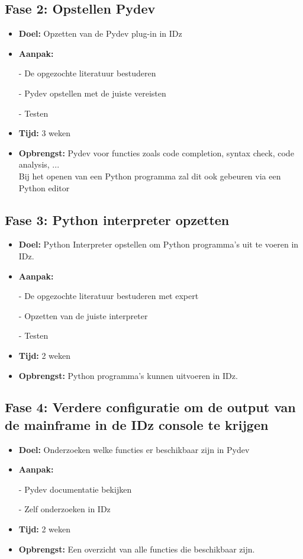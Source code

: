 \subsection{Fase 2: Opstellen Pydev}
\begin{itemize}
    \item \textbf{Doel:}
    Opzetten van de Pydev plug-in in IDz
    \item \textbf{Aanpak:}
    \item[-] De opgezochte literatuur bestuderen
    \item[-] Pydev opstellen met de juiste vereisten
    \item[-] Testen
    \item \textbf{Tijd:} 3 weken
    \item \textbf{Opbrengst:}
    Pydev voor functies zoals code completion, syntax check, code analysis, ... \\ 
    Bij het openen van een Python programma zal dit ook gebeuren via een Python editor
\end{itemize}


\subsection{Fase 3: Python interpreter opzetten}
\begin{itemize}
    \item \textbf{Doel:}
    Python Interpreter opstellen om Python programma's uit te voeren in IDz.
    \item \textbf{Aanpak:}
    \item[-] De opgezochte literatuur bestuderen met expert
    \item[-] Opzetten van de juiste interpreter
    \item[-] Testen
    
    \item \textbf{Tijd:} 2 weken
    \item \textbf{Opbrengst:}
    Python programma's kunnen uitvoeren in IDz.
\end{itemize}


\subsection{Fase 4: Verdere configuratie om de output van de mainframe in de IDz console te krijgen}
\begin{itemize}
    \item \textbf{Doel:}
    Onderzoeken welke functies er beschikbaar zijn in Pydev
    \item \textbf{Aanpak:}
    \item[-] Pydev documentatie bekijken
    \item[-] Zelf onderzoeken in IDz
    
    \item \textbf{Tijd:} 2 weken
    \item \textbf{Opbrengst:}
    Een overzicht van alle functies die beschikbaar zijn. 
\end{itemize}

